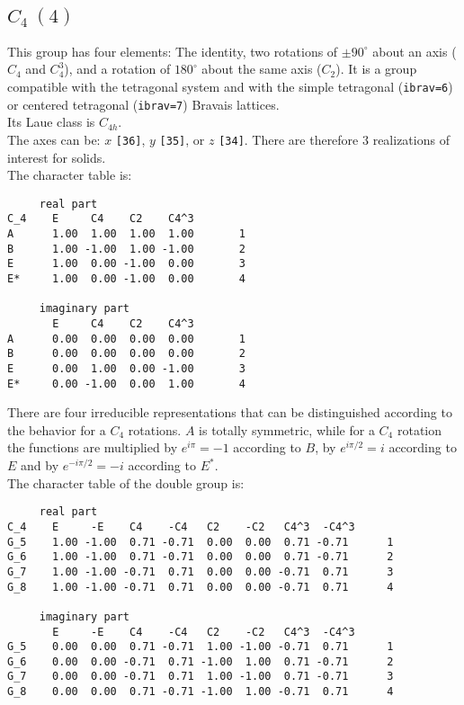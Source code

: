 \documentclass[12pt,a4paper]{article}
\begin{document}
\newpage
\subsection{\color{web-blue}$C_4\ (4)$}
This group has four elements: The identity, two rotations of $\pm90^\circ$ 
about an axis ($C_4$ and $C_4^3$), and a rotation of $180^\circ$ about the same
axis ($C_2$).
It is a group compatible with the tetragonal system and with the
simple tetragonal (\texttt{ibrav=6}) or centered tetragonal (\texttt{ibrav=7})
Bravais lattices. \\ 
Its Laue class is $C_{4h}$. \\
The axes can be: $x$ \texttt{[36]}, $y$ \texttt{[35]}, or $z$ \texttt{[34]}.
There are therefore $3$ realizations of interest for solids. \\
The character table is:
\begin{verbatim}
     real part
C_4    E     C4    C2    C4^3
A      1.00  1.00  1.00  1.00       1
B      1.00 -1.00  1.00 -1.00       2
E      1.00  0.00 -1.00  0.00       3
E*     1.00  0.00 -1.00  0.00       4

     imaginary part
       E     C4    C2    C4^3
A      0.00  0.00  0.00  0.00       1
B      0.00  0.00  0.00  0.00       2
E      0.00  1.00  0.00 -1.00       3
E*     0.00 -1.00  0.00  1.00       4
\end{verbatim}
There are four irreducible representations that can be distinguished according
to the behavior for a $C_4$ rotations. $A$ is totally symmetric, while for a
$C_4$ rotation the functions are multiplied by $e^{i\pi}=-1$ according to 
$B$, by $e^{i\pi/2}=i$ according to $E$ and by $e^{-i\pi/2}=-i$ according to
$E^*$. \\
The character table of the double group is:
\begin{verbatim}
     real part
C_4    E     -E    C4    -C4   C2    -C2   C4^3  -C4^3
G_5    1.00 -1.00  0.71 -0.71  0.00  0.00  0.71 -0.71      1
G_6    1.00 -1.00  0.71 -0.71  0.00  0.00  0.71 -0.71      2
G_7    1.00 -1.00 -0.71  0.71  0.00  0.00 -0.71  0.71      3
G_8    1.00 -1.00 -0.71  0.71  0.00  0.00 -0.71  0.71      4

     imaginary part
       E     -E    C4    -C4   C2    -C2   C4^3  -C4^3
G_5    0.00  0.00  0.71 -0.71  1.00 -1.00 -0.71  0.71      1
G_6    0.00  0.00 -0.71  0.71 -1.00  1.00  0.71 -0.71      2
G_7    0.00  0.00 -0.71  0.71  1.00 -1.00  0.71 -0.71      3
G_8    0.00  0.00  0.71 -0.71 -1.00  1.00 -0.71  0.71      4
\end{verbatim}
\end{document}
